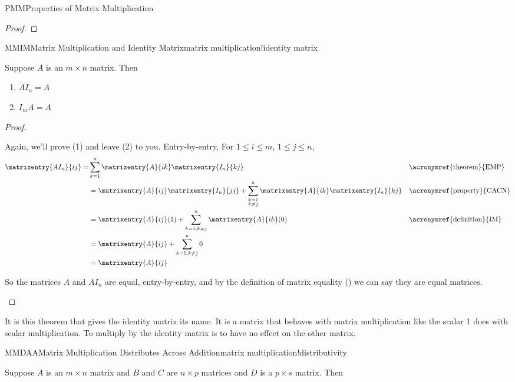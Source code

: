 \begin{subsect}{PMM}{Properties of Matrix Multiplication}
\begin{proof}
%
\end{proof}
%
\begin{theorem}{MMIM}{Matrix Multiplication and Identity Matrix}{matrix multiplication!identity matrix}
\begin{para}Suppose $A$ is an $m\times n$ matrix.  Then
\begin{enumerate}
\item $AI_n=A$
\item $I_mA=A$
\end{enumerate}
\end{para}
\end{theorem}
%
\begin{proof}
\begin{para}Again, we'll prove (1) and leave (2) to you.  Entry-by-entry,    For $1\leq i\leq m$, $1\leq j\leq n$,
%
\begin{align*}
\matrixentry{AI_n}{ij}=&
\sum_{k=1}^{n}\matrixentry{A}{ik}\matrixentry{I_n}{kj}
&&\text{\acronymref{theorem}{EMP}}\\
%
&=\matrixentry{A}{ij}\matrixentry{I_n}{jj}+\sum_{\substack{k=1\\k\neq j}}^{n}\matrixentry{A}{ik}\matrixentry{I_n}{kj}
&&\text{\acronymref{property}{CACN}}\\
%
&=\matrixentry{A}{ij}(1)+\sum_{k=1, k\neq j}^{n}\matrixentry{A}{ik}(0)
&&\text{\acronymref{definition}{IM}}\\
%
&=\matrixentry{A}{ij}+\sum_{k=1, k\neq j}^{n}0\\
&=\matrixentry{A}{ij}
\end{align*}
\end{para}
%
\begin{para}So the matrices $A$ and $AI_n$ are equal, entry-by-entry, and by the definition of matrix equality () we can say they are equal matrices.\end{para}
%
\end{proof}
%
\begin{para}It is this theorem that gives the identity matrix its name.  It is a matrix that behaves with matrix multiplication like the scalar 1 does with scalar multiplication.  To multiply by the identity matrix is to have no effect on the other matrix.\end{para}
%
\begin{theorem}{MMDAA}{Matrix Multiplication Distributes Across Addition}{matrix multiplication!distributivity}
\begin{para}Suppose $A$ is an $m\times n$ matrix and $B$ and $C$ are $n\times p$ matrices and $D$ is a $p\times s$ matrix.    Then

\end{para}
\end{theorem}
\end{subsect}
